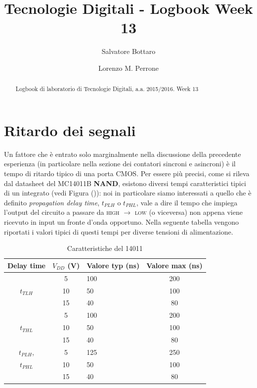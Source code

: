 \documentclass[journal, a4paper]{IEEEtran}
\begin{document}
	\title{Tecnologie Digitali - Logbook Week 13}
	\author[1]{Salvatore Bottaro}
		\author[2]{Lorenzo M. Perrone}
	\maketitle
	
\begin{abstract}
	Logbook di laboratorio di Tecnologie Digitali, a.a. 2015/2016. Week 13
\end{abstract}

\section{Ritardo dei segnali}
Un fattore che è entrato solo marginalmente nella discussione della precedente esperienza (in particolare nella sezione dei contatori sincroni e asincroni) è il tempo di ritardo tipico di una porta \textsc{CMOS}. Per essere più precisi, come si rileva dal datasheet del \textsc{MC14011B} \textbf{NAND}, esistono diversi tempi caratteristici tipici di un integrato (vedi Figura ()): noi in particolare siamo interessati a quello che è definito \textit{propagation delay time}, $t_{PLH}$ o $t_{PHL}$, vale a dire il tempo che impiega l'output del circuito a passare da \textsc{high} $\rightarrow$ \textsc{low} (o viceversa) non appena viene ricevuto in input un fronte d'onda opportuno. Nella seguente tabella vengono riportati i valori tipici di questi tempi per diverse tensioni di alimentazione.\\


\begin{table}
\centering
\caption{Caratteristiche del 14011}
\label{tab:data}
\begin{tabular}{c|cl|c}
  \hline
  \textbf{Delay time} & $V_{DD}$ (V)& \textbf{Valore typ} (ns)& \textbf{Valore max} (ns) \\
  \hline 
            &  5  & 100 &  200  \\ \cline{2-3}
  $t_{TLH}$ & 10  & 50 &  100   \\ \cline{2-3}
            & 15  & 40 &   80   \\
  \hline 
            &  5  & 100 &  200  \\ \cline{2-3}
  $t_{THL}$ & 10  & 50 &  100   \\ \cline{2-3}
            & 15  & 40 &   80   \\
  \hline
  $t_{PLH}$, &  5  & 125 &  250   \\ \cline{2-3}
  $t_{PHL}$  & 10  & 50 &   100   \\ \cline{2-3}
             & 15  & 40 &   80   \\
  \hline
\end{tabular}
\end{table}
~\\
\end{document}
